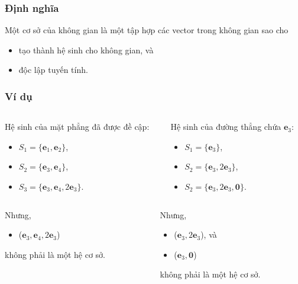 \begin{frame}
\frametitle{Định nghĩa}
    \begin{tcolorbox}[colback=blue!10!, colframe=blue!50!black, title=Hệ cơ sở]
        Một cơ sở của không gian là một tập hợp các vector trong không gian sao cho 
    \begin{itemize}
        \item tạo thành hệ sinh cho không gian, và
        \item độc lập tuyến tính.
    \end{itemize}
    \end{tcolorbox}
\end{frame}
\begin{frame}
    \frametitle{Ví dụ}
    \begin{columns}
        \begin{column}{0.5\textwidth}
        Hệ sinh của mặt phẳng đã được đề cập:
        \begin{itemize}
            \item \(S_1=\{\mathbf{e}_1 ,\mathbf{e}_2\}\),
            \item \(S_2 =\{\mathbf{e}_3 ,\mathbf{e}_4\}\),
            \item \(S_3 =\{\mathbf{e}_3 ,\mathbf{e}_4 ,2\mathbf{e}_3\}\).
        \end{itemize}
        \end{column}
        \begin{column}{0.5\textwidth}
            Hệ sinh của đường thẳng chứa \(\mathbf{e}_3\):
            \begin{itemize}
                \item \(S_1 =\{\mathbf{e}_3\}\),
                \item \(S_2 =\{\mathbf{e}_3 ,2\mathbf{e}_3\}\),
                \item \(S_2 =\{\mathbf{e}_3 ,2\mathbf{e}_3 ,\mathbf{0}\}\).
            \end{itemize}
        \end{column}
        \end{columns}
    \vspace{10pt}

    \begin{columns}
        \begin{column}{0.5\textwidth}
            Nhưng,
            \begin{itemize}
                \item (\(\mathbf{e}_3 ,\mathbf{e}_4 ,2\mathbf{e}_3\))
            \end{itemize}
            không phải là một hệ cơ sở.
        \end{column}
        \begin{column}{0.5\textwidth}
            Nhưng,
            \begin{itemize}
                \item (\(\mathbf{e}_3 ,2\mathbf{e}_3\)), và
                \item (\(\mathbf{e}_3 ,\mathbf{0}\))
            \end{itemize}
            không phải là một hệ cơ sở.
        \end{column}
    \end{columns}
\end{frame}
